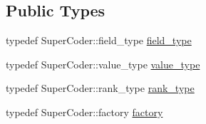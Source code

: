 \subsection*{Public Types}
\begin{DoxyCompactItemize}
\item 
typedef Super\-Coder\-::field\-\_\-type \hyperlink{classkodo_1_1largest__nonzero__index__decoder_af1a8cc14d5dfa8a9f5a08b0cd53c392e}{field\-\_\-type}
\begin{DoxyCompactList}\small\item\em \end{DoxyCompactList}\item 
typedef Super\-Coder\-::value\-\_\-type \hyperlink{classkodo_1_1largest__nonzero__index__decoder_abac6bf1e872928e31bf490785aea9397}{value\-\_\-type}
\begin{DoxyCompactList}\small\item\em \end{DoxyCompactList}\item 
typedef Super\-Coder\-::rank\-\_\-type \hyperlink{classkodo_1_1largest__nonzero__index__decoder_a27df8d24f0a91c14f8143d8a88205e7a}{rank\-\_\-type}
\begin{DoxyCompactList}\small\item\em \end{DoxyCompactList}\item 
typedef Super\-Coder\-::factory \hyperlink{classkodo_1_1largest__nonzero__index__decoder_a2ad24f3f2995893ad2524bd085e48579}{factory}
\begin{DoxyCompactList}\small\item\em \end{DoxyCompactList}\end{DoxyCompactItemize}
